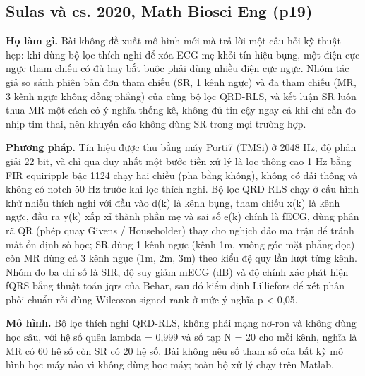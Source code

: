\documentclass[12pt,a4paper]{article}
\begin{document}
\subsection{Sulas và cs. 2020, Math Biosci Eng \normalfont\small (p19)}
\par\vspace{2pt}
\par\vspace{4pt}
\noindent \textbf{Họ làm gì.} Bài không đề xuất mô hình mới mà trả lời một câu hỏi kỹ thuật hẹp: khi dùng bộ lọc thích nghi để xóa ECG mẹ khỏi tín hiệu bụng, một điện cực ngực tham chiếu có đủ hay bắt buộc phải dùng nhiều điện cực ngực. Nhóm tác giả so sánh phiên bản đơn tham chiếu (SR, 1 kênh ngực) và đa tham chiếu (MR, 3 kênh ngực không đồng phẳng) của cùng bộ lọc QRD-RLS, và kết luận SR luôn thua MR một cách có ý nghĩa thống kê, không đủ tin cậy ngay cả khi chỉ cần đo nhịp tim thai, nên khuyến cáo không dùng SR trong mọi trường hợp.\par\vspace{3pt}
\noindent \textbf{Phương pháp.} Tín hiệu được thu bằng máy Porti7 (TMSi) ở 2048 Hz, độ phân giải 22 bit, và chỉ qua duy nhất một bước tiền xử lý là lọc thông cao 1 Hz bằng FIR equiripple bậc 1124 chạy hai chiều (pha bằng không), không có dải thông và không có notch 50 Hz trước khi lọc thích nghi. Bộ lọc QRD-RLS chạy ở cấu hình khử nhiễu thích nghi với đầu vào d(k) là kênh bụng, tham chiếu x(k) là kênh ngực, đầu ra y(k) xấp xỉ thành phần mẹ và sai số e(k) chính là fECG, dùng phân rã QR (phép quay Givens / Householder) thay cho nghịch đảo ma trận để tránh mất ổn định số học; SR dùng 1 kênh ngực (kênh 1m, vuông góc mặt phẳng dọc) còn MR dùng cả 3 kênh ngực (1m, 2m, 3m) theo kiểu đệ quy lần lượt từng kênh. Nhóm đo ba chỉ số là SIR, độ suy giảm mECG (dB) và độ chính xác phát hiện fQRS bằng thuật toán jqrs của Behar, sau đó kiểm định Lilliefors để xét phân phối chuẩn rồi dùng Wilcoxon signed rank ở mức ý nghĩa p < 0,05.\par\vspace{3pt}
\noindent \textbf{Mô hình.} Bộ lọc thích nghi QRD-RLS, không phải mạng nơ-ron và không dùng học sâu, với hệ số quên lambda = 0,999 và số tạp N = 20 cho mỗi kênh, nghĩa là MR có 60 hệ số còn SR có 20 hệ số. Bài không nêu số tham số của bất kỳ mô hình học máy nào vì không dùng học máy; toàn bộ xử lý chạy trên Matlab.\par\vspace{3pt}
\end{document}

